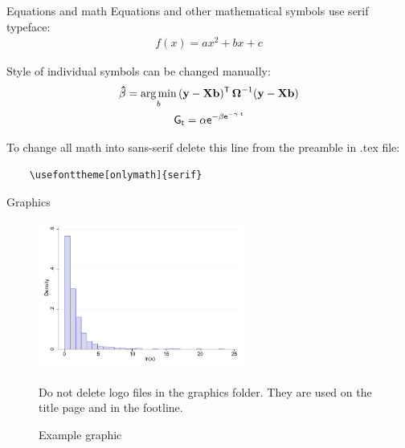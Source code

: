 \documentclass[11pt,t]{beamer}
\begin{document}
\begin{frame}[fragile]{Equations and math}   %
Equations and other mathematical symbols use serif typeface:
\begin{gather*}
f(x)= a x^2 + b x + c
\end{gather*}

Style of individual symbols can be changed manually:
\begin{gather*}
\mathbf{\hat{\beta}} = \underset{b}{\rm arg\,min}\,(\mathbf{y}- \mathbf{X} \mathbf{b})^{\mathsf{T}}\,\boldsymbol{\Omega}^{-1}(\mathbf{y}- \mathbf{X} \mathbf{b}) \\
\mathsf{    G_t = \alpha e^{-\beta e^{-\gamma \cdot t}}    }
\end{gather*}

To change all math into sans-serif delete this line from the preamble in .tex file:
	\begin{verbatim}
	\usefonttheme[onlymath]{serif}
	\end{verbatim}
\end{frame}




\begin{frame}{Graphics}
\vspace{-12pt}
	\begin{figure}
	\centering
	\includegraphics[width=0.6\textwidth]{example_figure.pdf}
	\caption{Example graphic \label{fig:figure1}}
	\footnotesize
	\flushleft
	Do not delete logo files in the graphics folder. They are used on the title page and in the footline.
	\end{figure}
\end{frame}
\end{document}

